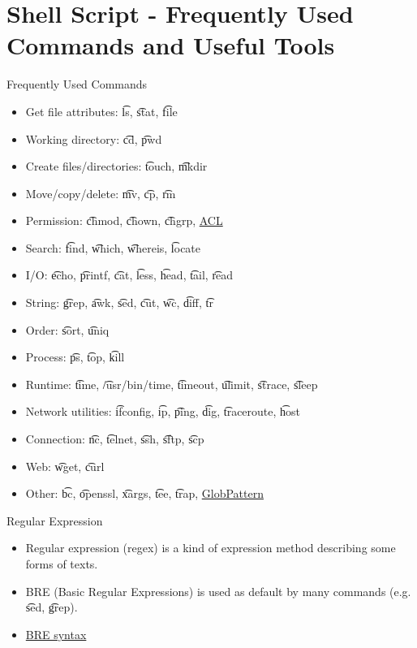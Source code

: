 \section{Shell Script - Frequently Used Commands and Useful Tools}

\begin{frame}{Frequently Used Commands}
\begin{multicols}{2}
\begin{itemize}
\item Get file attributes: \t{ls}, \t{stat}, \t{file}
\item Working directory: \t{cd}, \t{pwd}
\item Create files/directories: \t{touch}, \t{mkdir}
\item Move/copy/delete: \t{mv}, \t{cp}, \t{rm}
\item Permission: \t{chmod}, \t{chown}, \t{chgrp}, \href{https://man7.org/linux/man-pages/man5/acl.5.html}{ACL}
\item Search: \t{find}, \t{which}, \t{whereis}, \t{locate}
\item I/O: \t{echo}, \t{printf}, \t{cat}, \t{less}, \t{head}, \t{tail}, \t{read}
\item String: \t{grep}, \t{awk}, \t{sed}, \t{cut}, \t{wc}, \t{diff}, \t{tr}
\item Order: \t{sort}, \t{uniq}
\item Process: \t{ps}, \t{top}, \t{kill}
\item Runtime: \t{time}, \t{/usr/bin/time}, \t{timeout}, \t{ulimit}, \t{strace}, \t{sleep}
\item Network utilities: \t{ifconfig}, \t{ip}, \t{ping}, \t{dig}, \t{traceroute}, \t{host}
\item Connection: \t{nc}, \t{telnet}, \t{ssh}, \t{sftp}, \t{scp}
\item Web: \t{wget}, \t{curl}
\item Other: \t{bc}, \t{openssl}, \t{xargs}, \t{tee}, \t{trap}, \href{https://www.gnu.org/software/bash/manual/bash.html\#Pattern-Matching}{GlobPattern}
\end{itemize}
\end{multicols}
\end{frame}

\begin{frame}{Regular Expression}
\begin{itemize}
\item Regular expression (regex) is a kind of expression method describing some forms of texts.
\item BRE (Basic Regular Expressions) is used as default by many commands (e.g. \t{sed}, \t{grep}).
\item \href{https://www.gnu.org/software/sed/manual/html\_node/BRE-syntax.html}{BRE syntax}
\end{itemize}
\end{frame}


